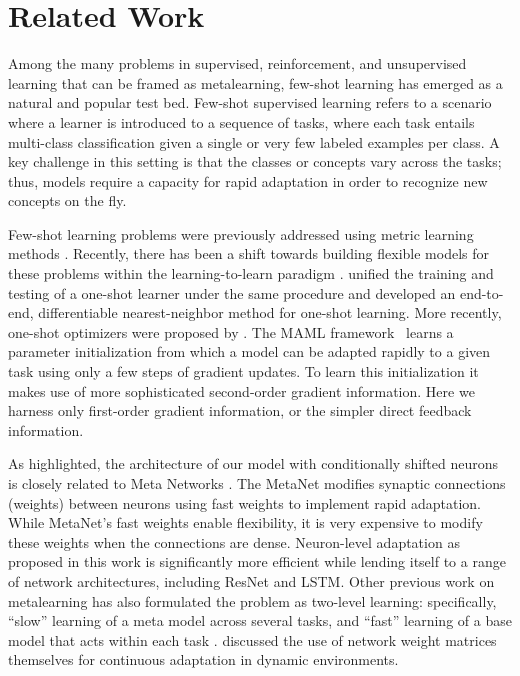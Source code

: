 \documentclass{article}
\begin{document}
\section{Related Work}
\label{related work}

Among the many problems in supervised, reinforcement, and unsupervised learning that can be framed as metalearning, few-shot learning has emerged as a natural and popular test bed.
Few-shot supervised learning refers to a scenario where a learner is introduced to a sequence of tasks, where each task entails multi-class classification given a single or very few labeled examples per class. A key challenge in this setting is that the classes or concepts vary across the tasks; thus, models require a capacity for rapid adaptation in order to recognize new concepts on the fly.

Few-shot learning problems were previously addressed using metric learning methods \cite{koch2015siamese}. Recently, there has been a shift towards building flexible models for these problems within the learning-to-learn paradigm \cite{mishra2017meta,santoro2016meta}. \citet{vinyals2016matching} unified the training and testing of a one-shot learner under the same procedure and developed an end-to-end, differentiable nearest-neighbor method for one-shot learning. More recently, one-shot optimizers were proposed by \citet{Sachin2017,finn2017model}. The MAML framework~\citep{finn2017model} learns a parameter initialization from which a model can be adapted rapidly to a given task using only a few steps of gradient updates. To learn this initialization it makes use of more sophisticated second-order gradient information. Here we harness only first-order gradient information, or the simpler direct feedback information.

As highlighted, the architecture of our model with conditionally shifted neurons is closely related to Meta Networks \cite{pmlr-v70-munkhdalai17a}. The MetaNet modifies synaptic connections (weights) between neurons using fast weights \cite{schmidhuber1987,hinton1987using} to implement rapid adaptation. While MetaNet's fast weights enable flexibility, it is very expensive to modify these weights when the connections are dense. Neuron-level adaptation as proposed in this work is significantly more efficient while lending itself to a range of network architectures, including ResNet and LSTM. Other previous work on metalearning has also formulated the problem as two-level learning: specifically, ``slow'' learning of a meta model across several tasks, and ``fast'' learning of a base model that acts within each task \cite{schmidhuber1987,bengio1990learning,hochreiter2001learning,mitchell1993explanation,vilalta2002perspective,mishra2017meta}.
\citet{schmidhuber1993self} discussed the use of network weight matrices themselves for continuous adaptation in dynamic environments.
\end{document}
